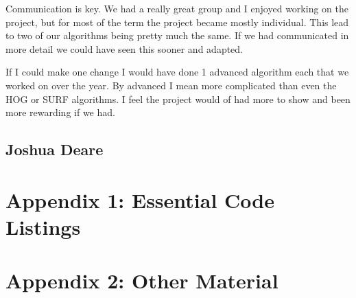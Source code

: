 \documentclass[letterpaper,10pt,titlepage]{article}
\begin{document}
Communication is key. We had a really great group and I enjoyed working on the
project, but for most of the term the project became mostly individual. This lead
to two of our algorithms being pretty much the same. If we had communicated in 
more detail we could have seen this sooner and adapted.


If I could make one change I would have done 1 advanced algorithm each that we worked on over the year.
By advanced I mean more complicated than even the HOG or SURF algorithms. I feel
the project would of had more to show and been more rewarding if we had.

\subsection*{Joshua Deare}

\section*{Appendix 1: Essential Code Listings}

\section*{Appendix 2: Other Material}
\end{document}
